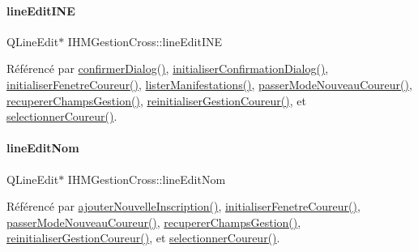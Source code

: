 \paragraph{\texorpdfstring{line\+Edit\+I\+NE}{lineEditINE}}
{\footnotesize\ttfamily Q\+Line\+Edit$\ast$ I\+H\+M\+Gestion\+Cross\+::line\+Edit\+I\+NE\hspace{0.3cm}{\ttfamily [private]}}



Référencé par \hyperlink{class_i_h_m_gestion_cross_a144933ab31ae263be7267b93bfd53a82}{confirmer\+Dialog()}, \hyperlink{class_i_h_m_gestion_cross_aa1c728319c825df582a014fc5bd43ea4}{initialiser\+Confirmation\+Dialog()}, \hyperlink{class_i_h_m_gestion_cross_aa5d9de499a66e52b843c4ef4c6074a60}{initialiser\+Fenetre\+Coureur()}, \hyperlink{class_i_h_m_gestion_cross_a0eadd8592c966c89bf7b5a25a0ae7589}{lister\+Manifestations()}, \hyperlink{class_i_h_m_gestion_cross_ac8f336c95a5f0c9eb8a4bc1c4bb83445}{passer\+Mode\+Nouveau\+Coureur()}, \hyperlink{class_i_h_m_gestion_cross_a271efe8d31fbe05fccfb2dc81e71971a}{recuperer\+Champs\+Gestion()}, \hyperlink{class_i_h_m_gestion_cross_a85c44933ec0dcbb591e01c832063367e}{reinitialiser\+Gestion\+Coureur()}, et \hyperlink{class_i_h_m_gestion_cross_ad71963d500fd61995fdae94e833db163}{selectionner\+Coureur()}.

\mbox{\label{class_i_h_m_gestion_cross_a633102626c5dedd575b51a1ba5c6e708}} 
\paragraph{\texorpdfstring{line\+Edit\+Nom}{lineEditNom}}
{\footnotesize\ttfamily Q\+Line\+Edit$\ast$ I\+H\+M\+Gestion\+Cross\+::line\+Edit\+Nom\hspace{0.3cm}{\ttfamily [private]}}



Référencé par \hyperlink{class_i_h_m_gestion_cross_af0165d32344af78b4edce59f88c90ff6}{ajouter\+Nouvelle\+Inscription()}, \hyperlink{class_i_h_m_gestion_cross_aa5d9de499a66e52b843c4ef4c6074a60}{initialiser\+Fenetre\+Coureur()}, \hyperlink{class_i_h_m_gestion_cross_ac8f336c95a5f0c9eb8a4bc1c4bb83445}{passer\+Mode\+Nouveau\+Coureur()}, \hyperlink{class_i_h_m_gestion_cross_a271efe8d31fbe05fccfb2dc81e71971a}{recuperer\+Champs\+Gestion()}, \hyperlink{class_i_h_m_gestion_cross_a85c44933ec0dcbb591e01c832063367e}{reinitialiser\+Gestion\+Coureur()}, et \hyperlink{class_i_h_m_gestion_cross_ad71963d500fd61995fdae94e833db163}{selectionner\+Coureur()}.

